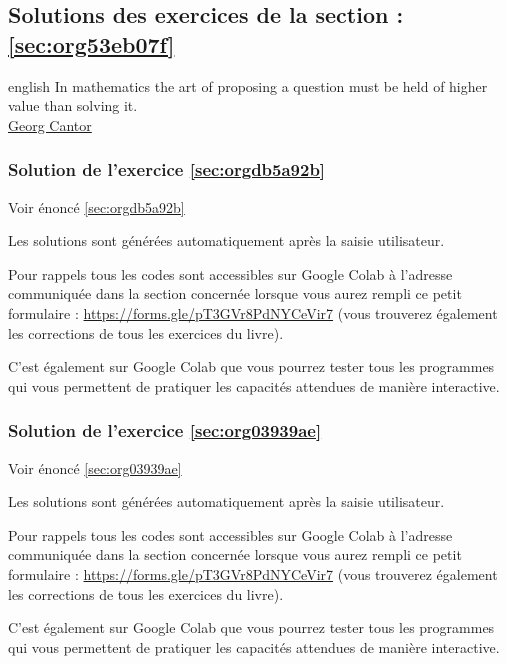 \documentclass[a4paper, 11pt, twoside]{article}
\begin{document}
\subsection{Solutions des exercices de la section : \ref{sec:org53eb07f}}
\label{sec:org374ed2a}

\begin{foreigndisplayquote}{english}
In mathematics the art of proposing a question must be held of
higher value than solving it.\\

\href{https://en.wikipedia.org/wiki/Georg\_Cantor}{Georg Cantor}
\end{foreigndisplayquote}

\startcontents[level-2]

\subsubsection{Solution de l'exercice \ref{sec:orgdb5a92b}}
\label{sec:org938bb3b}
Voir énoncé \ref{sec:orgdb5a92b}

Les solutions sont générées automatiquement après la saisie
utilisateur.

Pour rappels tous les codes sont accessibles sur Google Colab à
l'adresse communiquée dans la section concernée lorsque vous
aurez rempli ce petit formulaire :
\url{https://forms.gle/pT3GVr8PdNYCeVir7} (vous trouverez également
les corrections de tous les exercices du livre).

C'est également sur Google Colab que vous pourrez tester tous les
programmes qui vous permettent de pratiquer les capacités attendues
de manière interactive.

\subsubsection{Solution de l'exercice \ref{sec:org03939ae}}
\label{sec:org39262d2}
Voir énoncé \ref{sec:org03939ae}

Les solutions sont générées automatiquement après la saisie
utilisateur.

Pour rappels tous les codes sont accessibles sur Google Colab à
l'adresse communiquée dans la section concernée lorsque vous
aurez rempli ce petit formulaire :
\url{https://forms.gle/pT3GVr8PdNYCeVir7} (vous trouverez également
les corrections de tous les exercices du livre).

C'est également sur Google Colab que vous pourrez tester tous les
programmes qui vous permettent de pratiquer les capacités attendues
de manière interactive.
\stopcontents[level-2]
\end{document}

